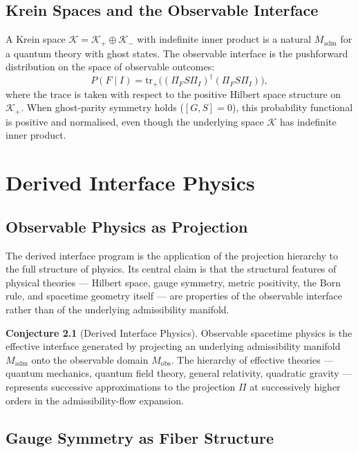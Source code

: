 \documentclass[12pt,a4paper]{book}
\theoremstyle{remark}
\theoremstyle{definition}
\newtheorem{conjecture}{Conjecture}[chapter]
\begin{document}
\section{Krein Spaces and the Observable Interface}

A Krein space $\mathcal{K} = \mathcal{K}_+ \oplus \mathcal{K}_-$ with
indefinite inner product is a natural $M_{\mathrm{adm}}$ for a quantum
theory with ghost states. The observable interface is the pushforward
distribution on the space of observable outcomes:
\begin{equation}
  P(F \mid I)
  = \mathrm{tr}_+\!\bigl((\Pi_F S \Pi_I)^\dagger (\Pi_F S \Pi_I)\bigr),
\end{equation}
where the trace is taken with respect to the positive Hilbert space
structure on $\mathcal{K}_+$. When ghost-parity symmetry holds
($[G,S]=0$), this probability functional is positive and normalised,
even though the underlying space $\mathcal{K}$ has indefinite inner
product.

\chapter{Derived Interface Physics}

\section{Observable Physics as Projection}

The derived interface program is the application of the projection
hierarchy to the full structure of physics. Its central claim is that
the structural features of physical theories --- Hilbert space, gauge
symmetry, metric positivity, the Born rule, and spacetime geometry itself
--- are properties of the observable interface rather than of the
underlying admissibility manifold.

\begin{conjecture}[Derived Interface Physics]
Observable spacetime physics is the effective interface generated by
projecting an underlying admissibility manifold $M_{\mathrm{adm}}$
onto the observable domain $M_{\mathrm{obs}}$. The hierarchy of effective
theories --- quantum mechanics, quantum field theory, general relativity,
quadratic gravity --- represents successive approximations to the
projection $\Pi$ at successively higher orders in the admissibility-flow
expansion.
\end{conjecture}

\section{Gauge Symmetry as Fiber Structure}
\end{document}

